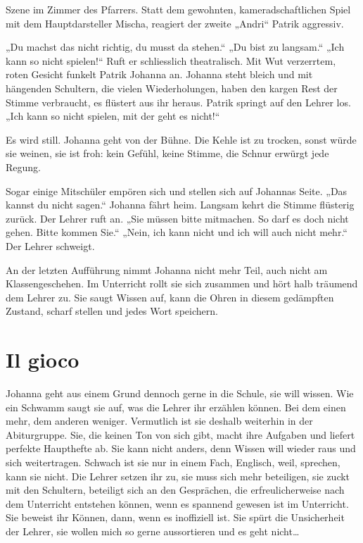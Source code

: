 \documentclass[10pt,titlepage,a5paper]{book}
\begin{document}
Szene im Zimmer des Pfarrers. Statt dem gewohnten, kameradschaftlichen Spiel mit dem Hauptdarsteller Mischa, reagiert der zweite „Andri“ Patrik aggressiv. 

„Du machst das nicht richtig, du musst da stehen.“ „Du bist zu langsam.“ „Ich kann so nicht spielen!“ Ruft er schliesslich theatralisch. Mit Wut verzerrtem, roten Gesicht funkelt Patrik  Johanna an. Johanna steht bleich und mit hängenden Schultern, die vielen Wiederholungen, haben den kargen Rest der Stimme verbraucht, es flüstert aus ihr heraus. Patrik springt auf den Lehrer los. „Ich kann so nicht spielen, mit der geht es nicht!“

Es wird still. Johanna geht von der Bühne. Die Kehle ist zu trocken, sonst würde sie weinen, sie ist froh: kein Gefühl, keine Stimme, die Schnur erwürgt jede Regung. 

Sogar einige Mitschüler empören sich und stellen sich auf Johannas Seite. „Das kannst du nicht sagen.“ Johanna fährt heim. Langsam kehrt die Stimme flüsterig zurück. Der Lehrer ruft an. „Sie müssen bitte mitmachen. So darf es doch nicht gehen. Bitte kommen Sie.“ „Nein, ich kann nicht und ich will auch nicht mehr.“ Der Lehrer schweigt.

An der letzten Aufführung nimmt Johanna nicht mehr Teil, auch nicht am Klassengeschehen. Im Unterricht rollt sie sich zusammen und hört halb träumend dem Lehrer zu. Sie saugt Wissen auf, kann die Ohren in diesem gedämpften Zustand, scharf stellen und jedes Wort speichern. 



\section*{Il gioco}


Johanna geht aus einem Grund dennoch gerne in die Schule, sie will wissen. Wie ein Schwamm saugt sie auf, was die Lehrer ihr erzählen können. Bei dem einen mehr, dem anderen weniger. Vermutlich ist sie deshalb weiterhin in der Abiturgruppe. Sie, die keinen Ton von sich gibt, macht ihre Aufgaben und liefert perfekte Haupthefte ab. Sie kann nicht anders, denn Wissen will wieder raus und sich weitertragen. Schwach ist sie nur in einem Fach, Englisch, weil, sprechen, kann sie nicht. Die Lehrer setzen ihr zu, sie muss sich mehr beteiligen, sie zuckt mit den Schultern, beteiligt sich an den Gesprächen, die erfreulicherweise nach dem Unterricht entstehen können, wenn es spannend gewesen ist im Unterricht. Sie beweist ihr Können, dann, wenn es inoffiziell ist. Sie spürt die Unsicherheit der Lehrer, sie wollen mich so gerne aussortieren und es geht nicht\dots 
\end{document}
